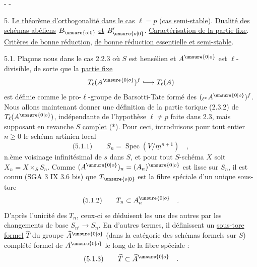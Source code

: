 
\begin{center}-  -\end{center}

5. \uline{Le théorème d'orthogonalité dans le cas} $\ell=p$ (\uline{cas semi-stable}). \uline{Dualité des schémas abéliens} $B_{\unsure{o|0}}$ \uline{et} $B'_{\unsure{o|0}}$. \uline{Caractérisation de la partie fixe}. \uline{Critères de bonne réduction}, \uline{de bonne réduction essentielle et semi-stable}.

5.1. Plaçons nous dans le cas 2.2.3 où $S$ est hensélien et $A^{\unsure{0|o}}$ est $\ell$-divisible, de sorte que la \uline{partie fixe}
\[
T_\ell(A^{\unsure{0|o}})^f\lhook\joinrel\longrightarrow T_\ell(A)
\]
est définie comme le pro-$\ell$-groupe de Barsotti-Tate formé des $({}_{\ell^\nu}A^{\unsure{0|o}})^f$.
Nous allons maintenant donner une définition de la partie torique (2.3.2) de $T_\ell(A^{\unsure{0|o}})$, indépendante de l'hypothèse $\ell\neq p$ faite dans 2.3, mais supposant en revanche $S$ \uline{complet} (*). Pour ceci, introduisons pour tout entier $n\geq0$ le schéma artinien local
\[
\text{(5.1.1)}\qquad S_n=\operatorname{Spec}(V/\underline m^{n+1})\quad ,
\]
n.ème voisinage infinitésimal de $s$ dans $S$, et pour tout $S$-schéma $X$ soit $X_n=X\times_S S_n$. Comme $(A^{\unsure{0|o}})_n=(A_n)^{\unsure{0|o}}$ est lisse sur $S_n$, il est connu (SGA 3 IX 3.6 bis) que $T_{\unsure{o|0}}$ est la fibre spéciale d'un unique sous-tore
\[
\text{(5.1.2)}\qquad T_n\subset A_n^{\unsure{0|o}}\quad .
\]
D'après l'unicité des $T_n$, ceux-ci se déduisent les uns des autres par les changements de base $S_{n'}\longrightarrow S_n$. En d'autres termes, il définissent un \uline{sous-tore formel} $\widehat T$ du groupe $\widehat A^{\unsure{0|o}}$ (dans la catégorie des schémas formels sur $S$) complété formel de $A^{\unsure{0|o}}$ le long de la fibre spéciale :
\[
\text{(5.1.3)}\qquad\widehat T\subset\widehat A^{\unsure{0|o}}\quad .
\]

